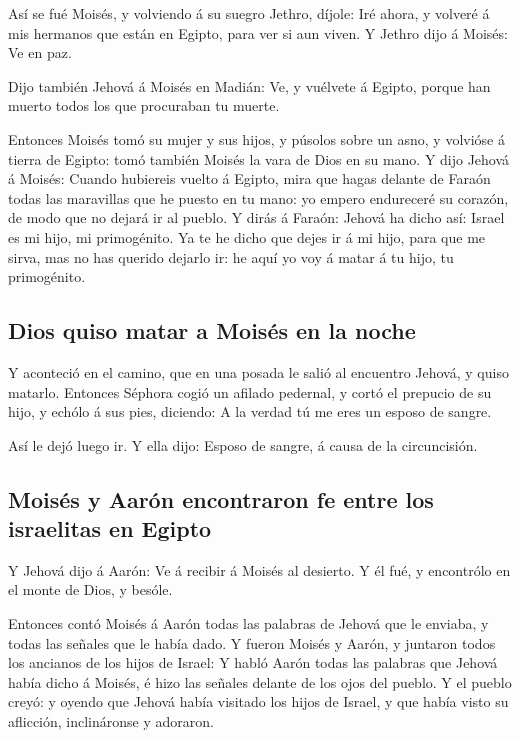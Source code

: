  Así se fué Moisés, y volviendo á su suegro Jethro,
díjole: Iré ahora, y volveré á mis hermanos que están en Egipto, para
ver si aun viven. Y Jethro dijo á Moisés: Ve en paz.

 Dijo también Jehová á Moisés en Madián: Ve, y vuélvete á
Egipto, porque han muerto todos los que procuraban tu muerte.

 Entonces Moisés tomó su mujer y sus hijos, y púsolos
sobre un asno, y volvióse á tierra de Egipto: tomó también Moisés la
vara de Dios en su mano.  Y dijo Jehová á Moisés: Cuando
hubiereis vuelto á Egipto, mira que hagas delante de Faraón todas las
maravillas que he puesto en tu mano: yo empero endureceré su corazón, de
modo que no dejará ir al pueblo.  Y dirás á Faraón:
Jehová ha dicho así: Israel es mi hijo, mi primogénito. 
Ya te he dicho que dejes ir á mi hijo, para que me sirva, mas no has
querido dejarlo ir: he aquí yo voy á matar á tu hijo, tu primogénito.

\hypertarget{dios-quiso-matar-a-moisuxe9s-en-la-noche}{%
\subsection{Dios quiso matar a Moisés en la
noche}\label{dios-quiso-matar-a-moisuxe9s-en-la-noche}}

 Y aconteció en el camino, que en una posada le salió al
encuentro Jehová, y quiso matarlo.  Entonces Séphora
cogió un afilado pedernal, y cortó el prepucio de su hijo, y echólo á
sus pies, diciendo: A la verdad tú me eres un esposo de sangre.

 Así le dejó luego ir. Y ella dijo: Esposo de sangre, á
causa de la circuncisión.

\hypertarget{moisuxe9s-y-aaruxf3n-encontraron-fe-entre-los-israelitas-en-egipto}{%
\subsection{Moisés y Aarón encontraron fe entre los israelitas en
Egipto}\label{moisuxe9s-y-aaruxf3n-encontraron-fe-entre-los-israelitas-en-egipto}}

 Y Jehová dijo á Aarón: Ve á recibir á Moisés al
desierto. Y él fué, y encontrólo en el monte de Dios, y besóle.

 Entonces contó Moisés á Aarón todas las palabras de
Jehová que le enviaba, y todas las señales que le había dado.
 Y fueron Moisés y Aarón, y juntaron todos los ancianos
de los hijos de Israel:  Y habló Aarón todas las palabras
que Jehová había dicho á Moisés, é hizo las señales delante de los ojos
del pueblo.  Y el pueblo creyó: y oyendo que Jehová había
visitado los hijos de Israel, y que había visto su aflicción,
inclináronse y adoraron.

